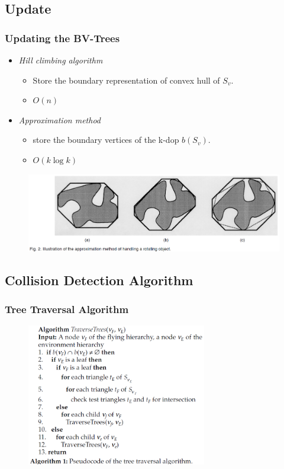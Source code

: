 \documentclass{beamer}
\begin{document}
\subsection{Update}
	\begin{frame}
	\frametitle{Updating the BV-Trees}
	\begin{itemize}
		\item {\it Hill climbing algorithm}
			\begin{itemize}
				\item Store the boundary representation of convex hull of $S_{v}$.
				\item $O(n)$
			\end{itemize}
		\item {\it Approximation method}
			\begin{itemize}
				\item store the boundary vertices of the k-dop $b(S_{v})$.
				\item $O(k\log k)$
			\end{itemize}
	\end{itemize}	
	\begin{figure}
		\centering
		\includegraphics[width=1.0\textwidth]{./figure/update.PNG}
	\end{figure}
	\end{frame}

\subsection{Collision Detection Algorithm}
	\begin{frame}
	\frametitle{Tree Traversal Algorithm}
	\begin{figure}[h!]
		\centering
		\includegraphics[width=0.7\textwidth]{./figure/algorithm.PNG}
	\end{figure}
	\end{frame}
\end{document}

